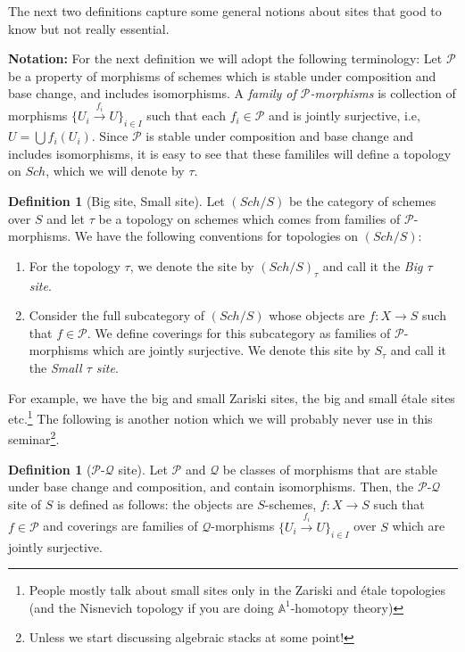 \documentclass[11pt]{amsart}
\newcommand{\A}{{\mathbb A}}
\theoremstyle{definition}
\newtheorem{definition}[theorem]{Definition}
\begin{document}
The next two definitions capture some general notions about sites that good to know but not really essential.

\noindent\textbf{Notation:} For the next definition we will adopt the following terminology: Let $\mathcal{P}$ be a property of morphisms of schemes which is stable under composition and base change, and includes isomorphisms. A \textit{family of $\mathcal{P}$-morphisms} is collection of morphisms $\{U_i \overset{f_i}{\to} U\}_{i\in I}$ such that each $f_i\in \mathcal{P}$ and is jointly surjective, i.e, $U = \bigcup f_i(U_i)$. Since $\mathcal{P}$ is stable under composition and base change and includes isomorphisms, it is easy to see that these famililes will define a topology on $\mathit{Sch}$, which we will denote by $\tau$.


\begin{definition}[Big site, Small site]
	Let $(\mathit{Sch}/S)$ be the category of schemes over $S$ and let $\tau$ be a topology on schemes which comes from families of $\mathcal{P}$-morphisms. We have the following conventions for topologies on $(\mathit{Sch}/S)$:
	\begin{enumerate}
		\item[\textsc{Big site:}] For the topology $\tau$, we denote the site by $(\mathit{Sch}/S)_{\tau}$ and call it the \textit{Big $\tau$ site}.
		\item[\textsc{Small site:}] Consider the full subcategory of $(\mathit{Sch}/S)$ whose objects are $f: X\rightarrow S$ such that $f\in\mathcal{P}$. We define coverings for this subcategory as families of $\mathcal{P}$-morphisms which are jointly surjective. We denote this site by $S_{\tau}$ and call it the \textit{Small $\tau$ site}.
	\end{enumerate}
\end{definition}
For example, we have the big and small Zariski sites, the big and small \'{e}tale sites etc.\footnote{People mostly talk about small sites only in the Zariski and \'{e}tale topologies (and the Nisnevich topology if you are doing $\A^1$-homotopy theory)} The following is another notion which we will probably never use in this seminar\footnote{Unless we start discussing algebraic stacks at some point!}.


\begin{definition}[$\mathcal{P}$-$\mathcal{Q}$ site]
	Let $\mathcal{P}$ and $\mathcal{Q}$ be classes of morphisms that are stable under base change and composition, and contain isomorphisms. Then, the $\mathcal{P}$-$\mathcal{Q}$ site of $S$ is defined as follows: the objects are $S$-schemes, $f:X\rightarrow S$ such that $f\in \mathcal{P}$ and coverings are families of $\mathcal{Q}$-morphisms $\{U_i \overset{f_i}{\to} U\}_{i\in I}$ over $S$ which are jointly surjective.
\end{definition}
\end{document}

